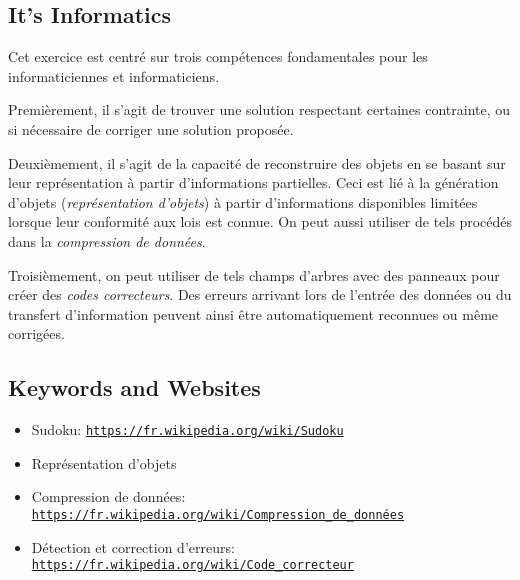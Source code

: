 \documentclass[a4paper,11pt]{report}
\newcommand{\BrochureUrlText}[1]{\texttt{#1}}
\begin{document}
\subsection*{It’s Informatics}

Cet exercice est centré sur trois compétences fondamentales pour les informaticiennes et informaticiens.

Premièrement, il s’agit de trouver une solution respectant certaines contrainte, ou si nécessaire de corriger une solution proposée.

Deuxièmement, il s’agit de la capacité de reconstruire des objets en se basant sur leur représentation à partir d’informations partielles. Ceci est lié à la génération d’objets (\emph{représentation d’objets}) à partir d’informations disponibles limitées lorsque leur conformité aux lois est connue. On peut aussi utiliser de tels procédés dans la \emph{compression de données}.

Troisièmement, on peut utiliser de tels champs d’arbres avec des panneaux pour créer des \emph{codes correcteurs}. Des erreurs arrivant lors de l’entrée des données ou du transfert d’information peuvent ainsi être automatiquement reconnues ou même corrigées.

{\raggedright

\subsection*{Keywords and Websites}

\begin{itemize}
  \item Sudoku: \href{https://fr.wikipedia.org/wiki/Sudoku}{\BrochureUrlText{https://fr.wikipedia.org/wiki/Sudoku}}
  \item Représentation d’objets
  \item Compression de données: \href{https://fr.wikipedia.org/wiki/Compression_de_donn\%C3\%A9es}{\BrochureUrlText{https://fr.wikipedia.org/wiki/Compression\_de\_données}}
  \item Détection et correction d’erreurs: \href{https://fr.wikipedia.org/wiki/Code_correcteur}{\BrochureUrlText{https://fr.wikipedia.org/wiki/Code\_correcteur}}
\end{itemize}


}
\end{document}
